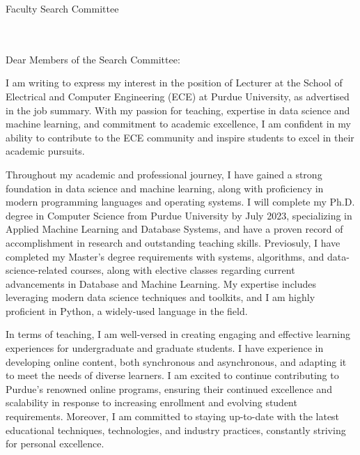 \documentclass[10pt]{article}
\begin{document}
\thispagestyle{plain}

\pagestyle{empty}

Faculty Search Committee \\
\SchoolName \\
\InstitutionName \\
\DepartmentAddress

\medskip
Dear Members of the Search Committee:

I am writing to express my interest in the position of Lecturer at the School of Electrical and Computer Engineering (ECE) at Purdue University, as advertised in the job summary. With my passion for teaching, expertise in data science and machine learning, and commitment to academic excellence, I am confident in my ability to contribute to the ECE community and inspire students to excel in their academic pursuits.

Throughout my academic and professional journey, I have gained a strong foundation in data science and machine learning, along with proficiency in modern programming languages and operating systems. I will complete my Ph.D. degree in Computer Science from Purdue University by July 2023, specializing in Applied Machine Learning and Database Systems, and have a proven record of accomplishment in research and outstanding teaching skills. Previosuly, I have completed my Master's degree requirements with systems, algorithms, and data-science-related courses, along with elective classes regarding current advancements in Database and Machine Learning. My expertise includes leveraging modern data science techniques and toolkits, and I am highly proficient in Python, a widely-used language in the field.

In terms of teaching, I am well-versed in creating engaging and effective learning experiences for undergraduate and graduate students. I have experience in developing online content, both synchronous and asynchronous, and adapting it to meet the needs of diverse learners. I am excited to continue contributing to Purdue's renowned online programs, ensuring their continued excellence and scalability in response to increasing enrollment and evolving student requirements. Moreover, I am committed to staying up-to-date with the latest educational techniques, technologies, and industry practices, constantly striving for personal excellence.
\end{document}

